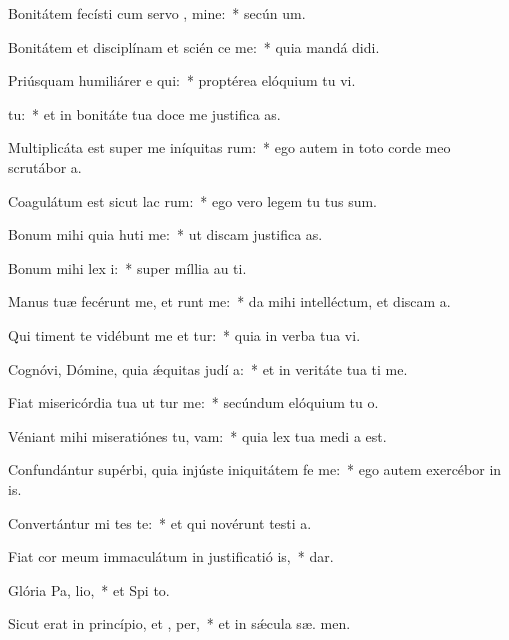 \item Bonitátem fecísti cum servo , mine:~* secún  um.
\item Bonitátem et disciplínam et scién ce me:~* quia mandá  didi.
\item Priúsquam humiliárer e qui:~* proptérea elóquium tu vi.
\item {}  tu:~* et in bonitáte tua doce me justifica as.
\item Multiplicáta est super me iníquitas rum:~* ego autem in toto corde meo scrutábor  a.
\item Coagulátum est sicut lac  rum:~* ego vero legem tu tus sum.
\item Bonum mihi quia huti me:~* ut discam justifica as.
\item Bonum mihi lex  i:~* super míllia au  ti.
\item Manus tuæ fecérunt me, et runt me:~* da mihi intelléctum, et discam  a.
\item Qui timent te vidébunt me et tur:~* quia in verba tua vi.
\item Cognóvi, Dómine, quia ǽquitas judí a:~* et in veritáte tua ti me.
\item Fiat misericórdia tua ut tur me:~* secúndum elóquium tu  o.
\item Véniant mihi miseratiónes tu,  vam:~* quia lex tua medi a est.
\item Confundántur supérbi, quia injúste iniquitátem fe  me:~* ego autem exercébor in  is.
\item Convertántur mi tes te:~* et qui novérunt testi a.
\item Fiat cor meum immaculátum in justificatió is,~*   dar.
\item Glória Pa,  lio,~* et Spi to.
\item Sicut erat in princípio, et ,  per,~* et in sǽcula sæ. men.
